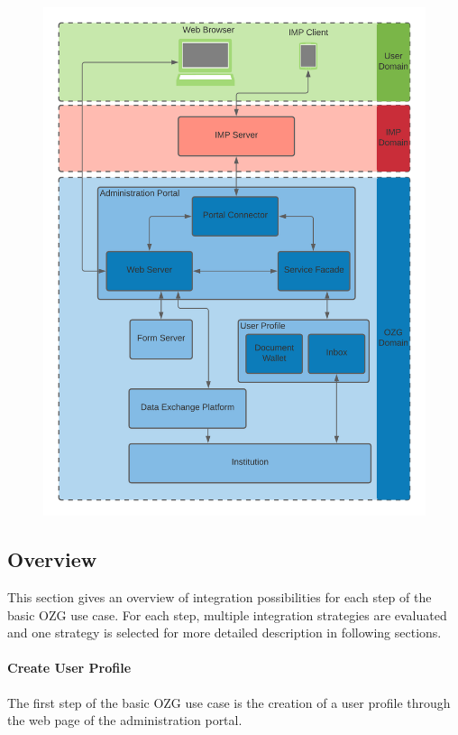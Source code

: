 \documentclass[
     12pt,         %
     a4paper,      %
     BCOR=10mm,version=first,     %
     DIV=14,version=first,        %
     ]{scrreprt}
\begin{document}
\begin{figure}[h]
    \centering
    \includegraphics[scale=0.15]{Diagrams/Integration Architecture 1/Overview.png}
\end{figure}

\subsection{Overview}

This section gives an overview of integration possibilities for each step of the basic OZG use case. For each step, multiple integration strategies are evaluated and one strategy is selected for more detailed description in following sections.

\paragraph{Create User Profile}

The first step of the basic OZG use case is the creation of a user profile through the web page of the administration portal.
\end{document}

